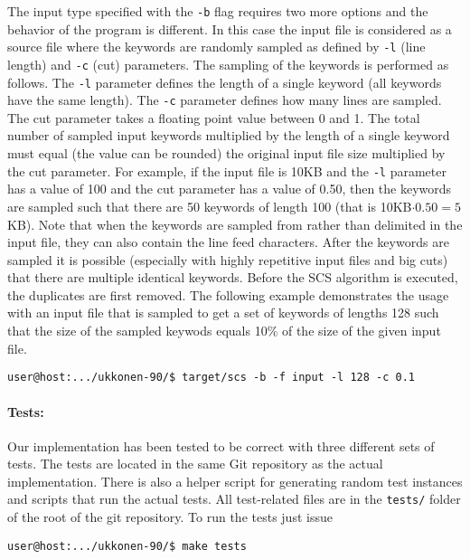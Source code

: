 \documentclass[english,twoside,censored,csm,algorithms-track-2020]{HYthesisML}
\theoremstyle{plain}
\theoremstyle{definition}
\numberwithin{testexample}{chapter}
\begin{document}
The input type specified with the \texttt{-b} flag requires two more options and the behavior of
the program is
different. In this case the input file is considered as a source file where the keywords are randomly
sampled as defined by \texttt{-l} (line length) and \texttt{-c} (cut) parameters.
The sampling of the keywords is
performed as follows. The \texttt{-l} parameter defines the length of a single keyword (all keywords have
the same length). The \texttt{-c} parameter defines how many lines are sampled. The cut parameter takes a
floating point value between 0 and 1. The total number of sampled input keywords multiplied by
the length of a single keyword must equal (the value can be rounded) the original input file size
multiplied by the cut parameter. For example, if the input file is 10KB and the \texttt{-l}
parameter has a value
of 100 and the cut parameter has a value of 0.50, then the keywords are sampled such that there
are 50 keywords of length 100 (that is 10KB$\cdot 0.50 = 5$KB). Note that when the
keywords are sampled from rather than delimited in the input file, they can also contain the line
feed characters. After the keywords are sampled it is possible (especially with highly repetitive
input files and big cuts) that there are multiple identical keywords. Before the SCS algorithm
is executed, the duplicates are first removed. The following example
demonstrates the usage with an input file that is sampled to get a set of keywords of lengths 128
such that the size of the sampled keywods equals 10\% of the size of the given input file.

\begin{verbatim}
user@host:.../ukkonen-90/$ target/scs -b -f input -l 128 -c 0.1
\end{verbatim}

\paragraph{Tests:}
Our implementation has been tested to be correct with three different sets of tests. The tests are
located in the same Git repository as the actual implementation. There is also a helper script for
generating random test instances and scripts that run the actual tests.
All test-related files are in the \texttt{tests/} folder of the
root of the git repository. To run the tests just issue

\begin{verbatim}
user@host:.../ukkonen-90/$ make tests
\end{verbatim}
\end{document}
